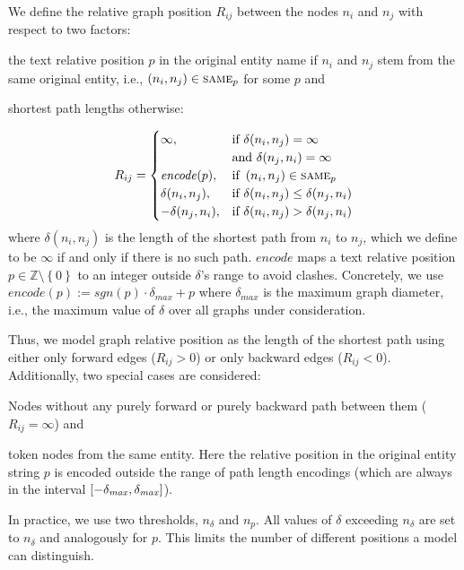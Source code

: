 \documentclass[11pt]{article}
\newcommand{\tuple}[1]{\ensuremath{\left(#1\right)}}
\newcommand{\eset}[1]{\left\{ #1 \right\}}
\newcommand{\Z}{\mathbb{Z}}
\newcommand{\Dmax}{\delta_{\mathit{max}}}  \newcommand{\hasType}{\textsc{has-type}}
\newcommand{\sameEnt}{\textsc{same}}
\begin{document}
We define the relative graph position $R_{ij}$ between the nodes $n_i$ and $n_j$ with respect to two factors:
\begin{enumerate*}[label={(\roman{*})}]
	\item the text relative position $p$ in the original entity name
		if $n_i$ and $n_j$ stem from the same original entity, i.e., $\tuple{n_i, n_j}\in \sameEnt{}_p$ for some $p$
		and
	\item shortest path lengths otherwise:
\end{enumerate*}
\begin{equation}
  \label{eq:9}
  R_{ij} =
  \begin{cases}
	\infty, & \text{if } \delta(n_i, n_j) = \infty \\
	   & \text{and } \delta(n_j, n_i) = \infty \\
	\mathit{encode}(p), & \text{if } \tuple{n_i, n_j} \in \sameEnt{}_p \\
    \delta(n_i, n_j),   & \text{if } \delta(n_i, n_j) \leq \delta(n_j, n_i) \\
    -\delta(n_j, n_i),  & \text{if } \delta(n_i, n_j) > \delta(n_j, n_i)
  \end{cases}
\end{equation}
where $\delta(n_i, n_j)$ is the length of the shortest path from $n_i$ to $n_j$,
which we define to be $\infty$ if and only if there is no such path.
$\mathit{encode}$ maps a text relative position $p\in\Z\setminus\eset{0}$
to an integer outside $\delta$'s range to avoid clashes.
Concretely, we use $\mathit{encode}(p) := \mathit{sgn}(p)\cdot \Dmax + p$
where $\Dmax$ is the maximum graph diameter,
i.e., the maximum value of $\delta$ over all graphs under consideration.

Thus, we model graph relative position
as the length of the shortest path
using either only forward edges ($R_{ij} > 0$) or only backward edges ($R_{ij} < 0$).
Additionally, two special cases are considered:
\begin{enumerate*}[label={(\roman*)}]
\item Nodes without any purely forward or purely backward path between them ($R_{ij} = \infty$) and
\item token nodes from the same entity. Here the relative position in the original entity string $p$ is encoded outside the range of path length encodings (which are always in the interval $\interval{-\Dmax}{\Dmax}$).
\end{enumerate*}

In practice,
we use two thresholds, $n_\delta$ and $n_p$.
All values of $\delta$ exceeding $n_\delta$ are set to $n_\delta$
and analogously for $p$.
This limits the number of different positions a model can distinguish.
\end{document}
